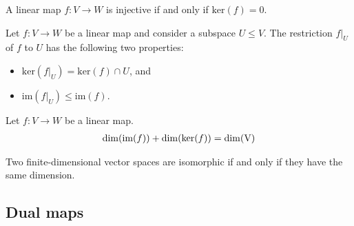 
    \begin{property}
        A linear map $f:V\rightarrow W$ is injective if and only if $\text{ker}(f) = 0$.
    \end{property}
    \begin{property}
        Let $f:V\rightarrow W$ be a linear map and consider a subspace $U\leq V$. The restriction $f|_U$ of $f$ to $U$ has the following two properties:
        \begin{itemize}
            \item $\text{ker}\left(f|_U\right) = \text{ker}(f)\cap U$, and
            \item $\text{im}\left(f|_U\right) \leq \text{im}(f)$.
        \end{itemize}
    \end{property}

    \begin{theorem}\label{linalgebra:dimension_theorem}
        Let $f:V\rightarrow W$ be a linear map.
        \begin{gather}
            \dim(\text{\upshape im}(f)) + \dim(\text{\upshape ker}(f)) = \dim(\text{\upshape V})
        \end{gather}
    \end{theorem}
    \begin{result}\label{linalgebra:dimension_isomorphism}
        Two finite-dimensional vector spaces are isomorphic if and only if they have the same dimension.
    \end{result}

\subsection{Dual maps}


